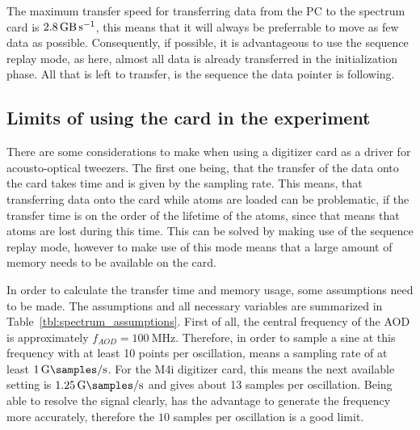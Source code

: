 The maximum transfer speed for transferring data from the PC to the spectrum card is $\SI{2.8}{\giga\byte\per\second}$, this means that it will always be preferrable to move as few data as possible. Consequently, if possible, it is advantageous to use the sequence replay mode, as here, almost all data is already transferred in the initialization phase. All that is left to transfer, is the sequence the data pointer is following.

\subsection{Limits of using the card in the experiment}

There are some considerations to make when using a digitizer card as a driver for acousto-optical tweezers. The first one being, that the transfer of the data onto the card takes time and is given by the sampling rate. This means, that transferring data onto the card while atoms are loaded can be problematic, if the transfer time is on the order of the lifetime of the atoms, since that means that atoms are lost during this time. This can be solved by making use of the sequence replay mode, however to make use of this mode means that a large amount of memory needs to be available on the card.

In order to calculate the transfer time and memory usage, some assumptions need to be made. The assumptions and all necessary variables are summarized in Table~\ref{tbl:spectrum_assumptions}. First of all, the central frequency of the AOD is approximately $f_{AOD} = \SI{100}{\mega\hertz}$. Therefore, in order to sample a sine at this frequency with at least 10 points per oscillation, means a sampling rate of at least $\SI{1}{\giga\samples\per\second}$. For the M4i digitizer card, this means the next available setting is $\SI{1.25}{\giga\samples\per\second}$ and gives about 13 samples per oscillation. Being able to resolve the signal clearly, has the advantage to generate the frequency more accurately, therefore the $10$ samples per oscillation is a good limit.

